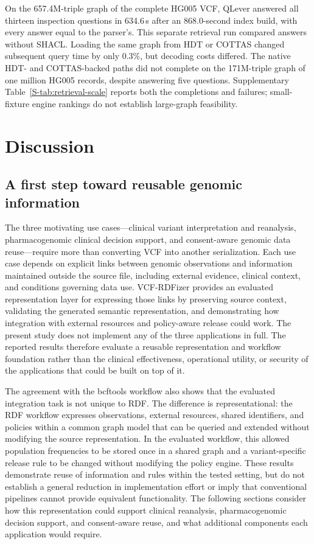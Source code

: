 \documentclass[pdflatex,sn-mathphys-num]{sn-jnl}
\begin{document}
On the 657.4M-triple graph of the complete HG005 VCF, QLever answered all thirteen inspection questions in 634.6\,s after an 868.0-second index build, with every answer equal to the parser's.
This separate retrieval run compared answers without SHACL.
Loading the same graph from HDT or COTTAS changed subsequent query time by only 0.3\%, but decoding costs differed.
The native HDT- and COTTAS-backed paths did not complete on the 171M-triple graph of one million HG005 records, despite answering five questions.
Supplementary Table~\ref{S-tab:retrieval-scale} reports both the completions and failures; small-fixture engine rankings do not establish large-graph feasibility.

\section{Discussion}\label{sec:discussion}
\subsection{A first step toward reusable genomic information}\label{subsec:disc-first-step}
The three motivating use cases---clinical variant interpretation and reanalysis, pharmacogenomic clinical decision support, and consent-aware genomic data reuse---require more than converting VCF into another serialization.
Each use case depends on explicit links between genomic observations and information maintained outside the source file, including external evidence, clinical context, and conditions governing data use.
VCF-RDFizer provides an evaluated representation layer for expressing those links by preserving source context, validating the generated semantic representation, and demonstrating how integration with external resources and policy-aware release could work.
The present study does not implement any of the three applications in full.
The reported results therefore evaluate a reusable representation and workflow foundation rather than the clinical effectiveness, operational utility, or security of the applications that could be built on top of it.

The agreement with the bcftools workflow also shows that the evaluated integration task is not unique to RDF.
The difference is representational: the RDF workflow expresses observations, external resources, shared identifiers, and policies within a common graph model that can be queried and extended without modifying the source representation.
In the evaluated workflow, this allowed population frequencies to be stored once in a shared graph and a variant-specific release rule to be changed without modifying the policy engine.
These results demonstrate reuse of information and rules within the tested setting, but do not establish a general reduction in implementation effort or imply that conventional pipelines cannot provide equivalent functionality.
The following sections consider how this representation could support clinical reanalysis, pharmacogenomic decision support, and consent-aware reuse, and what additional components each application would require.
\end{document}
